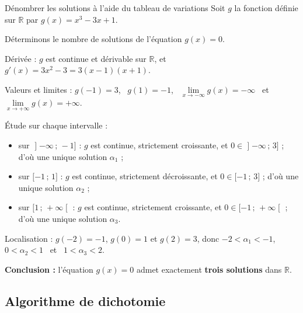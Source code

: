 \documentclass[11pt,a4paper]{article}
\newcommand{\R}{\mathbb{R}}
\newcommand{\intff}[2]{\mathopen{[}#1\,;\,#2\mathclose{]}}
\newcommand{\intfo}[2]{\mathopen{[}#1\,;\,#2\mathclose{[}}
\newcommand{\intof}[2]{\mathopen{]}#1\,;\,#2\mathclose{]}}
\newcommand{\limite}[2]{\lim\limits_{#1}#2}
\begin{document}
\begin{exemple}{Dénombrer les solutions à l'aide du tableau de variations}{}
Soit $g$ la fonction définie sur $\R$ par $g(x)=x^3-3x+1$.

Déterminons le nombre de solutions de l'équation $g(x)=0$.

\begin{etapes}
  \item Dérivée : $g$ est continue et dérivable sur $\R$, et
        $g'(x)=3x^2-3=3(x-1)(x+1)$.
  \item Valeurs et limites : $g(-1)=3$, \ $g(1)=-1$, \
        $\limite{x\to-\infty}{g(x)}=-\infty$ \ et \
        $\limite{x\to+\infty}{g(x)}=+\infty$.

\begin{center}
\end{center}

  \item Étude sur chaque intervalle :
  \begin{itemize}
    \item sur $\intof{-\infty}{-1}$ : $g$ est continue, strictement croissante,
          et $0\in\intof{-\infty}{3}$ ; d'où une unique solution $\alpha_1$ ;
    \item sur $\intff{-1}{1}$ : $g$ est continue, strictement décroissante, et
          $0\in\intff{-1}{3}$ ; d'où une unique solution $\alpha_2$ ;
    \item sur $\intfo{1}{+\infty}$ : $g$ est continue, strictement croissante, et
          $0\in\intfo{-1}{+\infty}$ ; d'où une unique solution $\alpha_3$.
  \end{itemize}
  \item Localisation : $g(-2)=-1$, $g(0)=1$ et $g(2)=3$, donc
        $-2<\alpha_1<-1$, \ $0<\alpha_2<1$ \ et \ $1<\alpha_3<2$.
\end{etapes}
\textbf{Conclusion :} l'équation $g(x)=0$ admet exactement \textbf{trois solutions}
dans $\R$.
\end{exemple}

\subsection{Algorithme de dichotomie}
\end{document}
